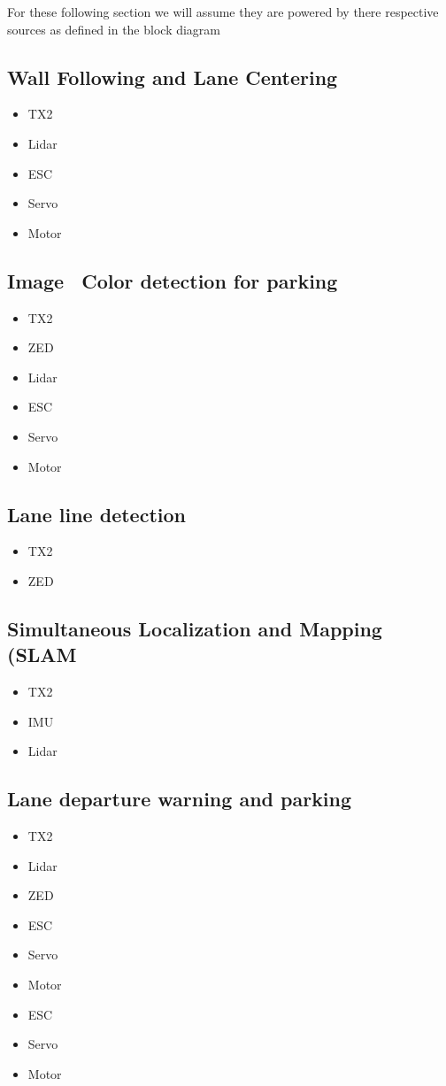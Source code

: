 \documentclass[]{article}
\begin{document}
For these following section we will assume they are powered by there respective sources as defined in the block diagram
\subsection{Wall Following and Lane Centering}
\begin{itemize}  
	\item TX2
	\item Lidar
	\item ESC
	\item Servo
	\item Motor
\end{itemize}
\subsection{Image \ Color detection for parking}
\begin{itemize}  
	\item TX2
	\item ZED
	\item Lidar
	\item ESC
	\item Servo
	\item Motor
\end{itemize}
\subsection{Lane line detection}
\begin{itemize}  
	\item TX2
	\item ZED
\end{itemize}
\subsection{Simultaneous Localization and Mapping (SLAM}
\begin{itemize}  
	\item TX2
	\item IMU
	\item Lidar
\end{itemize}
\subsection{Lane departure warning and parking}
\begin{itemize}  
	\item TX2
	\item Lidar
	\item ZED
	\item ESC
	\item Servo
	\item Motor
	\item ESC
	\item Servo
	\item Motor
\end{itemize}
\end{document}
